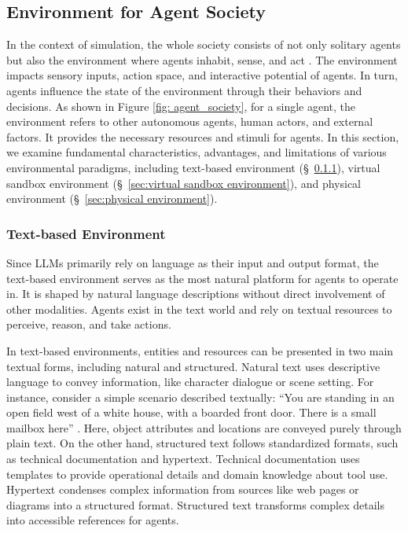 \subsection{Environment for Agent Society}\label{sec:Environment for Agent Society}
In the context of simulation, the whole society consists of not only solitary agents but also the environment where agents inhabit, sense, and act \cite{DBLP:journals/cacm/Maes95}. 
The environment impacts sensory inputs, action space, and interactive potential of agents. 
In turn, agents influence the state of the environment through their behaviors and decisions. 
As shown in Figure \ref{fig: agent_society}, for a single agent, the environment refers to other autonomous agents, human actors, and external factors. 
It provides the necessary resources and stimuli for agents. In this section, we examine fundamental characteristics, advantages, and limitations of various environmental paradigms, including text-based environment (\S \ \ref{sec:text-based environment}), virtual sandbox environment (\S \ \ref{sec:virtual sandbox environment}), and physical environment (\S \ \ref{sec:physical environment}).
\subsubsection{Text-based Environment}\label{sec:text-based environment}
Since LLMs primarily rely on language as their input and output format, the text-based environment serves as the most natural platform for agents to operate in. It is shaped by natural language descriptions without direct involvement of other modalities. Agents exist in the text world and rely on textual resources to perceive, reason, and take actions.

In text-based environments, entities and resources can be presented in two main textual forms, including natural and structured. Natural text uses descriptive language to convey information, like character dialogue or scene setting. For instance, consider a simple scenario described textually: ``You are standing in an open field west of a white house, with a boarded front door. There is a small mailbox here'' \cite{DBLP:conf/ijcai/CoteKYKBFMHAATT18}. Here, object attributes and locations are conveyed purely through plain text. On the other hand, structured text follows standardized formats, such as technical documentation and hypertext. Technical documentation uses templates to provide operational details and domain knowledge about tool use. Hypertext condenses complex information from sources like web pages \cite{DBLP:journals/corr/abs-2306-06070, DBLP:journals/corr/abs-2307-12856, DBLP:journals/corr/abs-2307-13854,DBLP:conf/nips/Yao0YN22} or diagrams into a structured format. Structured text transforms complex details into accessible references for agents.

